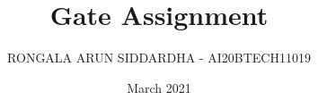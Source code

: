 \documentclass[journal,12pt,twocolumn]{IEEEtran}
\date{March 2021}
\DeclareMathOperator*{\Res}{Res}
\begin{document}
\newcommand{\multlinecomment}[1]{\directlua{-- #1}}
\newcommand{\BEQA}{\begin{eqnarray}}
\newcommand{\EEQA}{\end{eqnarray}}
\newcommand{\define}{\stackrel{\triangle}{=}}

\raggedbottom
\setlength{\parindent}{0pt}
\providecommand{\mbf}{\mathbf}
\providecommand{\pr}[1]{\ensuremath{\Pr\left(#1\right)}}
\providecommand{\qfunc}[1]{\ensuremath{Q\left(#1\right)}}
\providecommand{\fn}[1]{\ensuremath{f\left(#1\right)}}
\providecommand{\e}[1]{\ensuremath{E\left(#1\right)}}
\providecommand{\sbrak}[1]{\ensuremath{{}\left[#1\right]}}
\providecommand{\lsbrak}[1]{\ensuremath{{}\left[#1\right.}}
\providecommand{\rsbrak}[1]{\ensuremath{{}\left.#1\right]}}
\providecommand{\brak}[1]{\ensuremath{\left(#1\right)}}
\providecommand{\lbrak}[1]{\ensuremath{\left(#1\right.}}
\providecommand{\rbrak}[1]{\ensuremath{\left.#1\right)}}
\providecommand{\cbrak}[1]{\ensuremath{\left\{#1\right\}}}
\providecommand{\lcbrak}[1]{\ensuremath{\left\{#1\right.}}
\providecommand{\rcbrak}[1]{\ensuremath{\left.#1\right\}}}
\theoremstyle{remark}
\newtheorem{rem}{Remark}
\newcommand{\sgn}{\mathop{\mathrm{sgn}}}
\providecommand{\abs}[1]{\vert#1\vert}
\providecommand{\res}[1]{\Res\displaylimits_{#1}} 
\providecommand{\norm}[1]{\lVert#1\rVert}
\providecommand{\mtx}[1]{\mathbf{#1}}
\providecommand{\mean}[1]{E[ #1 ]}
\providecommand{\fourier}{\overset{\mathcal{F}}{ \rightleftharpoons}}
\providecommand{\system}{\overset{\mathcal{H}}{ \longleftrightarrow}}
\newcommand{\solution}{\noindent \textbf{Solution: }}
\newcommand{\cosec}{\,\text{cosec}\,}
\providecommand{\dec}[2]{\ensuremath{\overset{#1}{\underset{#2}{\gtrless}}}}
\newcommand{\myvec}[1]{\ensuremath{\begin{pmatrix}#1\end{pmatrix}}}
\newcommand{\mydet}[1]{\ensuremath{\begin{vmatrix}#1\end{vmatrix}}}
\makeatletter
\vspace{3cm}
\title{Gate Assignment}
\author{RONGALA ARUN SIDDARDHA - AI20BTECH11019}
\maketitle
\newpage
\bigskip
\renewcommand{\thetable}{\theenumi}
\end{document}
